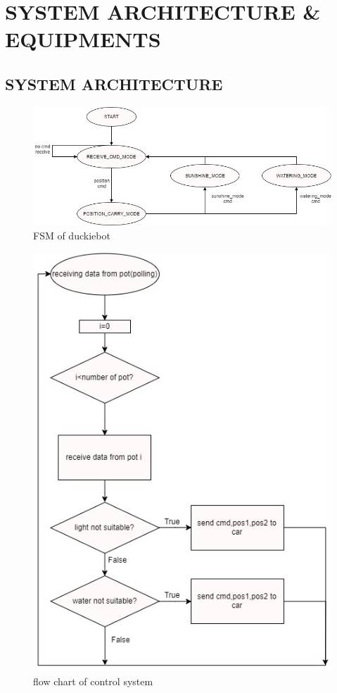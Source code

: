 \documentclass[a4paper, 10pt, conference]{ieeeconf}      %
\begin{document}
\section{SYSTEM ARCHITECTURE \& EQUIPMENTS}



\subsection{SYSTEM ARCHITECTURE}


\begin{figure}[htbp] %
\includegraphics[width=0.8\columnwidth]{car_fsm.jpg}
\centering
\caption{FSM of duckiebot}
\end{figure}

\begin{figure}[htbp] %
\includegraphics[width=0.8\columnwidth]{CmdServer_flowchart.jpg}
\centering
\caption{flow chart of control system}
\end{figure}
\end{document}
